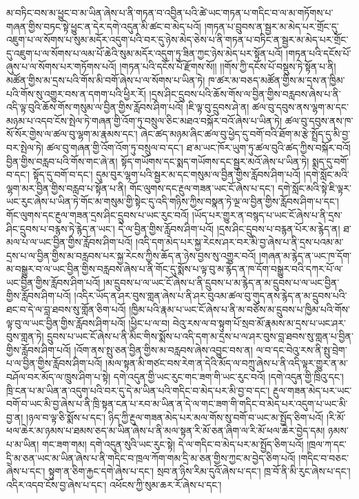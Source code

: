 མ་བཏིང་བས་མ་ཕྱུང་བ་མ་ཡིན་ཞེས་པ་ནི་གཏན་བ་འབྱིན་པའི་ཚེ་ཡང་གཏན་པ་གདིང་བ་ལ་མ་གཏོགས་པ་གཞན་གྱིས་བཏང་སྟེ་ཕྱུང་ན་དེར་དགེ་འདུན་མི་ཚང་བ་མེད་པའོ། །གཏན་པ་བྲུབས་ན་སྦྱར་མ་མེད་པར་གྲོང་དུ་འཇུག་པ་ལ་སོགས་པ་སུམ་མདོར་འདུག་པའི་བར་དུ་ཉེས་མེད་ཅེས་པ་ནི་གཏན་པ་བཏིང་ན་སྦྱར་མ་མེད་པར་གྲོང་དུ་འཇུག་པ་ལ་སོགས་པ་ལམ་པོ་ཆེའི་སུམ་མདོར་འདུག་ཏུ་ཟིན་ཀྱང་ཉེས་མེད་པར་སྟོན་པའོ། །གཏན་པའི་དངོས་པོ་ཞུས་པ་ལ་སོགས་པར་གཏོགས་པའོ། །གཏན་པའི་དངོས་པོ་རྫོགས་སོ།། །།གོས་ཀྱི་དངོས་པོ་བསྡུས་ཏེ་སྟོན་པ་ནི། མཚོན་གྱིས་མ་དྲས་པའི་གོས་མི་བགོ་ཞེས་པ་ལ་སོགས་པ་ཡིན་ཏེ། ཁ་ཚར་མ་བཅད་མཚོན་གྱིས་མ་དྲས་ན་ཁྱིམ་པའི་གོས་སུ་འགྱུར་བས་ན་དགག་པའི་ཕྱིར་རོ། །དྲས་ཤིང་དྲུབས་པའི་ཆོས་གོས་ལ་བྱིན་གྱིས་བརླབས་ཞེས་པ་ནི་འདི་ལྟ་བུའི་ཆོས་གོས་གསུམ་ལ་བྱིན་གྱིས་རློབས་ཤིག་པའོ། །ཇི་ལྟ་བུ་དྲུབས་ཤེ་ན། ཚལ་བུ་དབུས་ནས་ལྷག་མ་དང་མཉམ་པ་འདབ་ངོས་སྤེལ་ཏེ་གཞན་གྱི་འོག་ཏུ་བསྲུལ་ཅིང་མཐའ་བསྐོར་བའོ་ཞེས་པ་ཡིན་ཏེ། ཚལ་བུ་དབུས་ནས་ཁ་སོ་སོར་གྱེས་ལ་ཚལ་བུ་ལྷག་མ་རྣམས་དང་། ཞེང་ཚད་མཉམ་ཞིང་ཚལ་བུ་ཕྱེད་དུ་བགོ་བའི་ཐོག་མ་རྩེ་སྤྲོད་དུ་མི་བྱ་བར་སྤེལ་ཏེ། ཚལ་བུ་གཞན་གྱི་འོག་འོག་ཏུ་བསྲུལ་བ་དང་། ཐ་མ་ཡང་ཁོར་ཡུག་ཏུ་ཚལ་བུའི་ཚད་ཀྱིས་བསྐོར་བའོ། བྱིན་གྱིས་བརླབ་པའི་གོས་གང་ཞེ་ན། སྟོད་གཡོགས་དང་སྨད་གཡོགས་དང་སྦྱར་མའོ་ཞེས་པ་ཡིན་ཏེ། སྨད་དུ་བགོ་བ་དང་། སྟོད་དུ་བགོ་བ་དང་། དུམ་བུར་ལྷག་པའི་སྦྱར་མ་དང་གསུམ་ལ་བྱིན་གྱིས་རློབས་ཤིག་པའོ། །དགེ་སློང་མའི་ལྷག་མར་བྱིན་གྱིས་བརླབ་པ་སྟོན་པ་ནི། གོང་ལུགས་དང་རྔུལ་གཟན་ཡང་ངོ་ཞེས་པ་དང་། དགེ་སློང་མའི་སྟེ་ཇི་ལྟར་ཡང་རུང་ཞེས་པ་ཡིན་ཏེ་གོང་མ་གསུམ་གྱི་སྟེང་དུ་འདི་གཉིས་ཀྱིས་བསྣན་ཏེ་ལྔ་ལ་བྱིན་གྱིས་རློབས་ཤིག་པ་དང་། གོང་ལུགས་དང་རྔུལ་གཟན་དྲས་ཤིང་དྲུབས་པ་ཡང་རུང་བའོ། །ཡོད་པར་གྱུར་ན་བསྙད་པ་ཡང་ངོ་ཞེས་པ་ནི་དྲས་ཤིང་དྲུབས་པ་བརྙས་ཏེ་རྙེད་ན་ཡང་། དེ་ལ་བྱིན་གྱིས་རློབས་ཤིག་པའོ། །དྲས་ཤིང་དྲུབས་པ་བརྙན་པོར་མ་རྙེད་ན། ཐ་མལ་པ་ལ་ཡང་བྱིན་གྱིས་རློབས་ཤིག་པའོ། །འདི་དག་མེད་པར་སྐྱ་རེངས་ཤར་བར་མི་བྱ་ཞེས་པ་ནི་དྲས་པའམ་མ་དྲས་པ་ལ་བྱིན་གྱིས་མ་བརླབས་པར་སྐྱ་རེངས་ཀྱིས་ཆོད་ན་ཉེས་བྱས་སུ་འགྱུར་བའོ། །གཞན་མ་རྙེད་ན་ཡང་ཁ་དོག་མ་བསྒྱུར་བ་ལ་ཡང་བྱིན་གྱིས་བརླབས་ཞེས་པ་ནི་གོང་དུ་སྨོས་པ་ལྟ་བུ་མ་རྙེད་ན་ཁ་དོག་བསྒྱུར་བའི་དཀར་པོ་ལ་ཡང་བྱིན་གྱིས་རློབས་ཤིག་པའོ། །མ་དྲུབས་པ་ལ་ཡང་ངོ་ཞེས་པ་ནི་དྲུབས་པ་མ་རྙེད་ན་མ་དྲུབས་པ་ལ་ཡང་བྱིན་གྱིས་རློབས་ཤིག་པའོ། །འདིར་ཡོད་ན་ཤར་བུས་གླན་ཞེས་པ་ནི་ཤར་བུའམ་ཚལ་བུ་གུད་ནས་རྙེད་ན་མ་དྲུབས་པའི་ཐང་བ་དེ་ལ་བླ་ཐབས་སུ་གློན་ཅིག་པའོ། །ཁྱིམ་པའི་རྣམ་པ་ཡང་ངོ་ཞེས་པ་ནི་མ་བཙོས་མ་དྲུབས་པ་ཁྱིམ་པའི་གོས་ལྟ་བུ་ལ་ཡང་བྱིན་གྱིས་རློབས་ཤིག་པའོ། །ཕྱིང་པ་ལ་བ། བེའུ་རས་ལ་བ་སྟུག་པོ་སྲབ་མོ་རྣམས་མ་དྲས་པ་ཡང་ཤར་བུས་གླན་ཏེ། དྲུབས་པ་ཡང་ངོ་ཞེས་པ་ནི་མིང་གིས་སྨོས་པ་འདི་དག་མ་དྲས་པ་ལ་ཤར་བུས་བླ་ཐབས་སུ་གླན་པ་བྱིན་གྱིས་རློབས་ཤིག་པའོ། །འོག་ནས་སྤུ་ཅན་བྱིན་གྱིས་མ་བརླབས་ཞེས་འབྱུང་བས་ན། ལ་བ་དང་བེའུ་རས་ནི་སྤུ་བྲེག་པ་ལ་བྱིན་གྱིས་རློབས་ཤིག་པའོ། །མལ་སྟན་མི་གཙང་བས་རེག་ན་དེའི་མོད་ལ་བཀྲུ་ཞེས་པ་ནི་འདི་ལྟར་གྱུར་ན་མ་བཤོལ་བར་མོད་ལ་ཁྲུས་ཤིག་པ་སྟེ། དགེ་འདུན་གྱི་ཡང་རུང་གང་ཟག་གི་ཡང་རུང་བའོ། །དགེ་འདུན་གྱི་ཁྲིའུ་དང་། ཁྲི་ངན་པ་མ་ཡིན་ན་འདུག་པའི་བར་དུ་དེ་མ་ཡིན་པའི་གདིང་བ་མེད་པར་མི་བྱ་བ་དང་། རྔུལ་གཟན་མེད་པར་ཡང་བགོ་བ་ཡང་མི་བྱ་ཞེས་པ་ནི་ཁྲི་སྟན་ངན་པ་རབ་མ་ཡིན་ན་དེ་ལ་གང་ཟག་གི་གདིང་བ་མེད་པར་འདུག་པ་ཡང་མི་བྱ་ན། །ཉལ་བ་ལྟ་ཅི་སྨོས་པ་དང་། ཉིད་ཀྱི་རྔུལ་གཟན་མེད་པར་མལ་གོས་སུ་བགོ་བ་ཡང་མ་སྤྱོད་ཅིག་པའོ། །རི་མོ་ཕལ་ཆེར་མ་ཉམས་པ་ཐམས་ཅད་མ་ཡིན་ཞེས་པ་ནི་མལ་སྟན་རི་མོ་ཅན་ཞིག་ལ་རི་མོ་ཕལ་ཆེར་བྱེད་དམ། ཉམས་པ་མ་ཡིན། གང་ཟག་གམ། དགེ་འདུན་སུའི་ཡང་རུང་སྟེ། དེ་ལ་གདིང་བ་མེད་པར་མ་སྤྱོད་ཅིག་པའོ། །ཁྲལ་ཀ་དང་དྲི་མ་ཅན་ཡང་མ་ཡིན་ཞེས་པ་ནི་གདིང་བ་ཁྲལ་ཀོག་གམ་དྲི་མ་ཅན་གྱིས་ཀྱང་མ་བྱེད་ཅིག་པའོ། །གདིང་བ་བཅང་ཞེས་པ་དང་། སྟུག་ན་ཅིག་རྐྱང་དགེ་ཞེས་པ་དང་། སྲབ་ན་ཉིས་རིམ་དུའོ་ཞེས་པ་དང་། ཁྲ་བོ་ནི་མི་རུང་ཞེས་པ་དང་། འདིར་འདབ་ངོས་བྱ་ཞེས་པ་དང་། འཕོངས་ཀྱི་སུམ་ཆར་རོ་ཞེས་པ་དང་། 